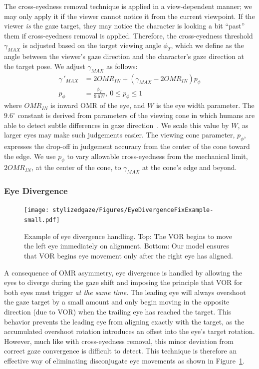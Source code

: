 The cross-eyedness removal technique is applied in a view-dependent manner; we may only apply it if the viewer cannot notice it from the current viewpoint.
If the viewer \emph{is} the gaze target, they may notice the character is looking a bit ``past'' them if cross-eyedness removal is applied.
Therefore, the cross-eyedness threshold $\gamma_{MAX}$ is adjusted based on the target viewing angle $\phi_T$, which we define as the angle between the viewer's gaze direction and the character's gaze direction at the target pose. We adjust $\gamma_{MAX}$ as follows:
%
\begin{align}
\label{eq:CrosseyednessFix}
\gamma\,'_{MAX} &= 2 OMR_{IN} + (\gamma_{MAX} - 2 OMR_{IN}) p_{\phi} \\
p_{\phi} &= \frac{\phi_T}{9.6W},~ 0 \le p_{\phi} \le 1 \nonumber
\end{align}
%
where $OMR_{IN}$ is inward OMR of the eye, and $W$ is the eye width parameter. The $9.6^{\circ}$ constant is derived from parameters of the viewing cone in which humans are able to detect subtle differences in gaze direction~\citep{argyle1976gaze}. We scale this value by $W$, as larger eyes may make such judgements easier. The viewing cone parameter, $p_{\phi}$, expresses the drop-off in judgement accuracy from the center of the cone toward the edge. We use $p_{\phi}$ to vary allowable cross-eyedness from the mechanical limit, $2 OMR_{IN}$, at the center of the cone, to $\gamma_{MAX}$ at the cone's edge and beyond.

\subsubsection{Eye Divergence}

\begin{figure}
\centering
\texttt{[image: stylizedgaze/Figures/EyeDivergenceFixExample-small.pdf]}
\caption{Example of eye divergence handling. Top: The VOR begins to move the left eye immediately on alignment. Bottom: Our model ensures that VOR begins eye movement only after the right eye has aligned.}
\label{fig:EyeDivergenceFixExample}
\end{figure}

A consequence of OMR asymmetry, eye divergence is handled by allowing the eyes to diverge during the gaze shift and imposing the principle that VOR for both eyes must trigger \emph{at the same time}. The leading eye will always overshoot the gaze target by a small amount and only begin moving in the opposite direction (due to VOR) when the trailing eye has reached the target. This behavior prevents the leading eye from aligning exactly with the target, as the accumulated overshoot rotation introduces an offset into the eye's target rotation. However, much like with cross-eyedness removal, this minor deviation from correct gaze convergence is difficult to detect. This technique is therefore an effective way of eliminating disconjugate eye movements as shown in Figure~\ref{fig:EyeDivergenceFixExample}.

